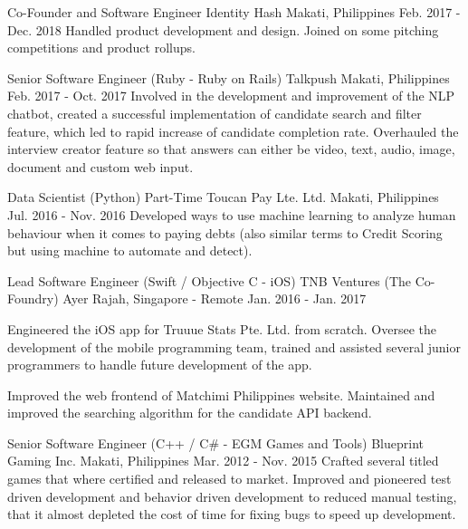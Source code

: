 \begin{cventries}
    \cventry
        {Co-Founder and Software Engineer}
        {Identity Hash}
        {Makati, Philippines}
        {Feb. 2017 - Dec. 2018}
        {Handled product development and design. Joined on some pitching competitions and product rollups.}
        
    \cventry
        {Senior Software Engineer (Ruby - Ruby on Rails)}
        {Talkpush}
        {Makati, Philippines}
        {Feb. 2017 - Oct. 2017}
        {Involved in the development and improvement of the NLP chatbot, created a successful implementation of candidate search and filter feature, which led to rapid increase of candidate completion rate. Overhauled the interview creator feature so that answers can either be video, text, audio, image, document and custom web input.}
    
    \cventry
        {Data Scientist (Python) Part-Time}
        {Toucan Pay Lte. Ltd.}
        {Makati, Philippines}
        {Jul. 2016 - Nov. 2016}
        {Developed ways to use machine learning to analyze human behaviour when it comes to paying debts (also similar terms to Credit Scoring but using machine to automate and detect).}
        
    \cventry
        {Lead Software Engineer (Swift / Objective C - iOS)}
        {TNB Ventures (The Co-Foundry)}
        {Ayer Rajah, Singapore - Remote}
        {Jan. 2016 - Jan. 2017}
        {
            \begin{cvitems}
                \item
                    {Engineered the iOS app for Truuue Stats Pte. Ltd. from scratch. Oversee the development of the mobile programming team, trained and assisted several junior programmers to handle future development of the app.}
                \item
                    {Improved the web frontend of Matchimi Philippines website. Maintained and improved the searching algorithm for the candidate API backend.}
            \end{cvitems}
        }
    
    \cventry
        {Senior Software Engineer (C++ / C\# - EGM Games and Tools)}
        {Blueprint Gaming Inc.}
        {Makati, Philippines}
        {Mar. 2012 - Nov. 2015}
        {Crafted several titled games that where certified and released to market. Improved and pioneered test driven development and behavior driven development to reduced manual testing, that it almost depleted the cost of time for fixing bugs to speed up development.}
        

\end{cventries}
